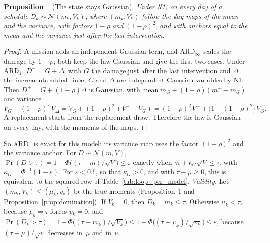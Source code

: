 \documentclass[11pt,a4paper]{article}
\theoremstyle{plain}
\newtheorem{proposition}[theorem]{Proposition}
\theoremstyle{definition}
\theoremstyle{remark}
\begin{document}
\begin{proposition}[The state stays Gaussian]\label{prop:gauss_exact}
Under N1, on every day of a schedule $D_k \sim \mathcal{N}(m_k, V_k)$, where $(m_k, V_k)$ follow the day maps of the mean and the variance, with factors $1-\rho$ and $(1-\rho)^2$, and with anchors equal to the mean and the variance just after the last intervention.
\end{proposition}
\begin{proof}
A mission adds an independent Gaussian term, and $\text{ARD}_\infty$ scales the damage by $1-\rho$; both keep the law Gaussian and give the first two cases.
Under $\text{ARD}_1$, $D^- = G + \Delta$, with $G$ the damage just after the last intervention and $\Delta$ the increments added since; $G$ and $\Delta$ are independent Gaussian variables by N1.
Then $D^+ = G + (1-\rho)\Delta$ is Gaussian, with mean $m_G + (1-\rho)(m^- - m_G)$ and variance
\[
  V_G + (1-\rho)^2\, V_\Delta = V_G + (1-\rho)^2\,(V^- - V_G) = (1-\rho)^2\, V^- + \bigl(1 - (1-\rho)^2\bigr)\, V_G .
\]
A replacement starts from the replacement draw.
Therefore the law is Gaussian on every day, with the moments of the maps.
\end{proof}

So $\text{ARD}_1$ is exact for this model; its variance map uses the factor $(1-\rho)^2$ and the variance anchor.
For $D \sim \mathcal{N}(m, V)$, $\Pr(D > \tau) = 1 - \Phi\bigl((\tau - m)/\sqrt{V}\bigr) \le \varepsilon$ exactly when $m + \kappa_G\sqrt{V} \le \tau$, with $\kappa_G = \Phi^{-1}(1-\varepsilon)$.
For $\varepsilon < 0.5$, so that $\kappa_G > 0$, and with $\tau - \mu \ge 0$, this is equivalent to the squared row of Table~\ref{tab:loop_per_model}.
\emph{Validity.} Let $(m_k, V_k) \le (\mu_k, v_k)$ be the true moments (Proposition~\ref{prop:gauss_exact} and Proposition~\ref{prop:domination}).
If $V_k = 0$, then $D_k = m_k \le \tau$.
Otherwise $\mu_k < \tau$, because $\mu_k = \tau$ forces $v_k = 0$, and $\Pr(D_k > \tau) = 1 - \Phi\bigl((\tau - m_k)/\sqrt{V_k}\bigr) \le 1 - \Phi\bigl((\tau - \mu_k)/\sqrt{v_k}\bigr) \le \varepsilon$, because $(\tau - \mu)/\sqrt{v}$ decreases in~$\mu$ and in~$v$.
\end{document}
